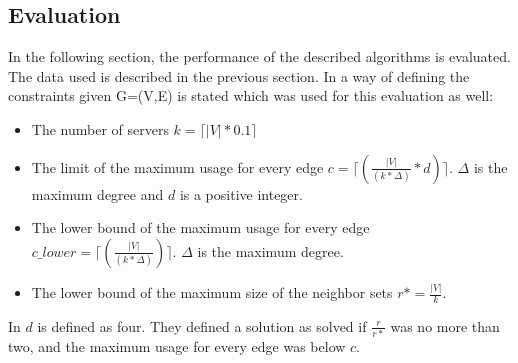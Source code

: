 \documentclass [12pt]{article}
\begin{document}
  \subsection{Evaluation}
  In the following section, the performance of the described algorithms is evaluated. The data used is described in the previous section.
  In \cite{caidabarebones} a way of defining the constraints given G=(V,E) is stated which was used for this evaluation as well: 
  \begin{itemize}
    \item{The number of servers $k = \lceil |V| * 0.1 \rceil$  }
    \item{The limit of the maximum usage for every edge $c = \lceil(\frac{|V|}{(k*\Delta)}*d)\rceil$. $\Delta$ is the maximum degree and $d$ is a positive integer.}
    \item{The lower bound of the maximum usage for every edge $c\_lower = \lceil(\frac{|V|}{(k*\Delta)})\rceil$. $\Delta$ is the maximum degree.}
    \item{The lower bound of the maximum size of the neighbor sets $r*=\frac{|V|}{k}$.}
  \end{itemize}
  In \cite{mirrorserver} $d$ is defined as four. They defined a solution as solved if $\frac{r}{r*}$ was no more than two, and the maximum usage for every edge was below $c$. 
  \newpage  
  \thispagestyle{empty}
\end{document}
